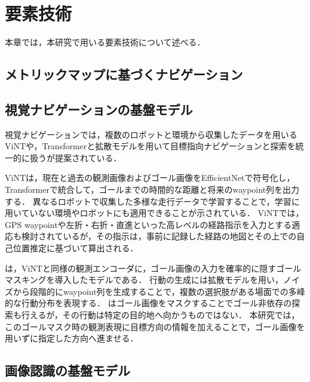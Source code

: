 \chapter{要素技術}
\label{chap:elemental}

本章では，本研究で用いる要素技術について述べる．

\section{メトリックマップに基づくナビゲーション}
\label{sec:metric_navigation}


\section{視覚ナビゲーションの基盤モデル}
\label{sec:related_vnm}

視覚ナビゲーションでは，複数のロボットと環境から収集したデータを用いるViNT\cite{vint}や，Transformerと拡散モデルを用いて目標指向ナビゲーションと探索を統一的に扱う\NoMaD\cite{nomad}が提案されている．

ViNTは，現在と過去の観測画像およびゴール画像をEfficientNet\cite{efficientnet}で符号化し，Transformerで統合して，ゴールまでの時間的な距離と将来のwaypoint列を出力する\cite{vint}．
異なるロボットで収集した多様な走行データで学習することで，学習に用いていない環境やロボットにも適用できることが示されている．
ViNTでは，GPS waypointや左折・右折・直進といった高レベルの経路指示を入力とする適応も検討されているが，その指示は，事前に記録した経路の地図とその上での自己位置推定に基づいて算出される\cite{vint}．

\NoMaD は，ViNTと同様の観測エンコーダに，ゴール画像の入力を確率的に隠すゴールマスキングを導入したモデルである\cite{nomad}．
行動の生成には拡散モデル\cite{ddpm,diffusion_policy}を用い，ノイズから段階的にwaypoint列を生成することで，複数の選択肢がある場面での多峰的な行動分布を表現する．
\NoMaD はゴール画像をマスクすることでゴール非依存の探索も行えるが，その行動は特定の目的地へ向かうものではない．
本研究では，このゴールマスク時の観測表現に目標方向の情報を加えることで，ゴール画像を用いずに指定した方向へ進ませる．

\section{画像認識の基盤モデル}
\label{sec:related_vision}

